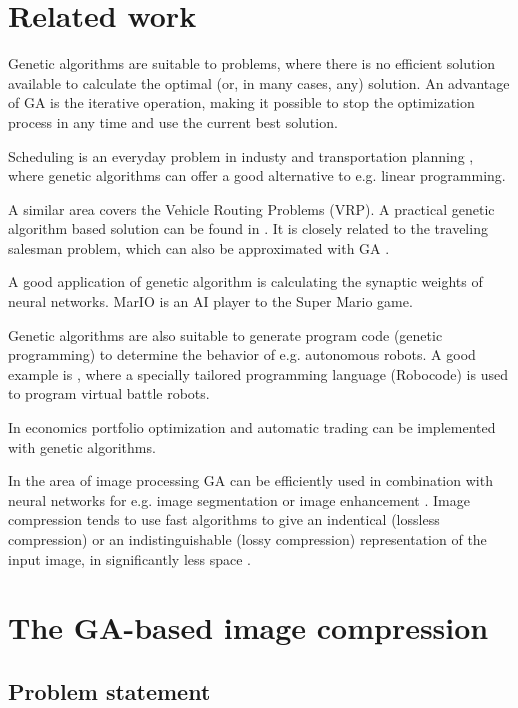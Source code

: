 \documentclass[conference]{IEEEtran}
\begin{document}
\section{Related work}

Genetic algorithms are suitable to problems, where
there is no efficient solution available to calculate
the optimal (or, in many cases, any) solution.
An advantage of GA is the iterative operation, making it possible
to stop the optimization process in any time and use the current
best solution.

Scheduling is an everyday problem in industy \cite{ga-scheduling}
and transportation planning \cite{ga-transport}, where genetic
algorithms can offer a good alternative to e.g. linear programming.

A similar area covers the Vehicle Routing Problems (VRP).
A practical genetic algorithm based solution can be found in \cite{ga-vrp}.
It is closely related to the traveling salesman problem, which
can also be approximated with GA \cite{ga-tsp}.

A good application of genetic algorithm is calculating
the synaptic weights of neural networks. MarIO \cite{mar-io}
is an AI player to the Super Mario game.

Genetic algorithms are also suitable to generate program code
(genetic programming) to determine the behavior of e.g.
autonomous robots. A good example is \cite{ga-robocode},
where a specially tailored programming language (Robocode)
is used to program virtual battle robots.

In economics portfolio optimization \cite{ga-portfolio}
and automatic trading \cite{ga-trading}
can be implemented with genetic algorithms.

In the area of image processing GA can be
efficiently used in combination with neural networks for e.g.
image segmentation \cite{ga-imgseg} or image enhancement \cite{ga-imgenh}.
Image compression tends to use fast algorithms to give an
indentical (lossless compression) or an indistinguishable
(lossy compression) representation of the input image,
in significantly less space \cite{image-proc}.

\section{The GA-based image compression}

\subsection{Problem statement}
\end{document}
